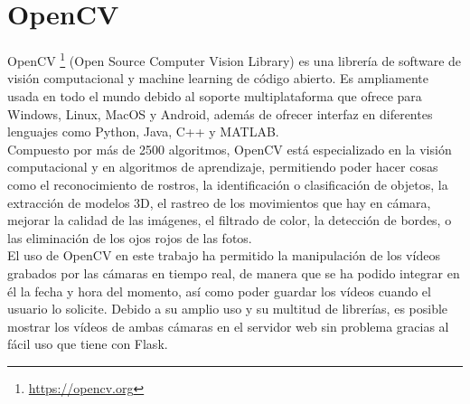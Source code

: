 \section{OpenCV}
\label{sec:opencv}
OpenCV \footnote{\url{https://opencv.org}} (Open Source Computer Vision Library) es una librería de software de visión computacional y machine learning de código abierto. Es ampliamente usada en todo el mundo debido al soporte multiplataforma que ofrece para Windows, Linux, MacOS y Android, además de ofrecer interfaz en diferentes lenguajes como Python, Java, C++ y MATLAB.\\
Compuesto por más de 2500 algoritmos, OpenCV está especializado en la visión computacional y en algoritmos de aprendizaje, permitiendo poder hacer cosas como el reconocimiento de rostros, la identificación o clasificación de objetos, la extracción de modelos 3D, el rastreo de los movimientos que hay en cámara, mejorar la calidad de las imágenes, el filtrado de color, la detección de bordes, o las eliminación de los ojos rojos de las fotos.\\
El uso de OpenCV en este trabajo ha permitido la manipulación de los vídeos grabados por las cámaras en tiempo real, de manera que se ha podido integrar en él la fecha y hora del momento, así como poder guardar los vídeos cuando el usuario lo solicite. Debido a su amplio uso y su multitud de librerías, es posible mostrar los vídeos de ambas cámaras en el servidor web sin problema gracias al fácil uso que tiene con Flask.\\

